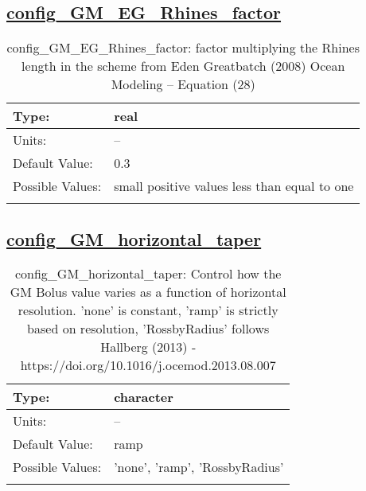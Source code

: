 \subsection[config\_GM\_EG\_Rhines\_factor]{\hyperref[sec:nm_tab_GM_eddy_parameterization]{config\_GM\_EG\_Rhines\_factor}}
\label{subsec:nm_sec_config_GM_EG_Rhines_factor}
\begin{center}
\begin{longtable}{| p{2.0in} || p{4.0in} |}
    \hline
    Type: & real \\
    \hline
    Units: & -- \\
    \hline
    Default Value: & 0.3 \\
    \hline
    Possible Values: & small positive values less than equal to one \\
    \hline
    \caption{config\_GM\_EG\_Rhines\_factor: factor multiplying the Rhines length in the scheme from Eden Greatbatch (2008) Ocean Modeling -- Equation (28)}
\end{longtable}
\end{center}
\subsection[config\_GM\_horizontal\_taper]{\hyperref[sec:nm_tab_GM_eddy_parameterization]{config\_GM\_horizontal\_taper}}
\label{subsec:nm_sec_config_GM_horizontal_taper}
\begin{center}
\begin{longtable}{| p{2.0in} || p{4.0in} |}
    \hline
    Type: & character \\
    \hline
    Units: & -- \\
    \hline
    Default Value: & ramp \\
    \hline
    Possible Values: & 'none', 'ramp', 'RossbyRadius' \\
    \hline
    \caption{config\_GM\_horizontal\_taper: Control how the GM Bolus value varies as a function of horizontal resolution. 'none' is constant, 'ramp' is strictly based on resolution, 'RossbyRadius' follows Hallberg (2013) - https://doi.org/10.1016/j.ocemod.2013.08.007}
\end{longtable}
\end{center}
